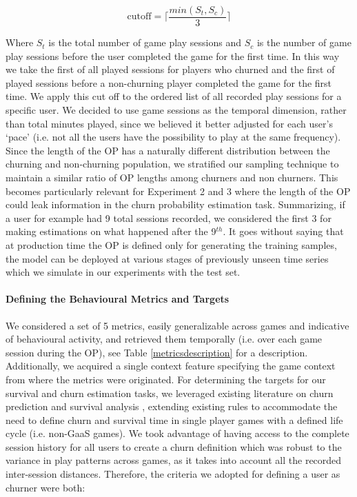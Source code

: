 \begin{equation}
\label{CutoffOP}
    \text{cutoff} = 
    \Biggl\lceil
        \dfrac
            {min(S_t, S_c)}
            {3}
    \Biggr\rceil
\end{equation}

Where $S_t$ is the total number of game play sessions and $S_c$ is the number of game play sessions before the user completed the game for the first time. In this way we take the first  of all played sessions for players who churned and the first  of played sessions before a non-churning player completed the game for the first time. We apply this cut off to the ordered list of all recorded play sessions for a specific user. We decided to use game sessions as the temporal dimension, rather than total minutes played, since we believed it better adjusted for each user's `pace' (i.e. not all the users have the possibility to play at the same frequency). Since the length of the OP has a naturally different distribution between the churning and non-churning population, we stratified our sampling technique to maintain a similar ratio of OP lengths among churners and non churners. This becomes particularly relevant for Experiment 2 and 3 where the length of the OP could leak information in the churn probability estimation task. Summarizing, if a user for example had 9 total sessions recorded, we considered the first 3 for making estimations on what happened after the 9$^{th}$. It goes without saying that at production time the OP is defined only for generating the training samples, the model can be deployed at various stages of previously unseen time series which we simulate in our experiments with the test set. 

\paragraph*{Defining the Behavioural Metrics and Targets}
We considered a set of 5 metrics, easily generalizable across games and indicative of behavioural activity, and retrieved them temporally  (i.e. over each game session during the OP), see Table \ref{metricsdescription} for a description. Additionally, we acquired a single context feature specifying the game context from where the metrics were originated. For determining the targets for our survival and churn estimation tasks, we leveraged existing literature on churn prediction \cite{drachen2016rapid, milovsevic2017early, lee2018game, perianez2016churn, runge2014churn, kim2017churn, hadiji2014predicting, xie2015predicting} and survival analysis \cite{viljanen2018playtime, demediuk2018player, lee2018game, bertens2017games}, extending existing rules to accommodate the need to define churn and survival time in single player games with a defined life cycle (i.e. non-GaaS games). We took advantage of having access to the complete session history for all users to create a churn definition which was robust to the variance in play patterns across games, as it takes into account all the recorded inter-session distances. Therefore, the criteria we adopted for defining a user as churner were both: 

